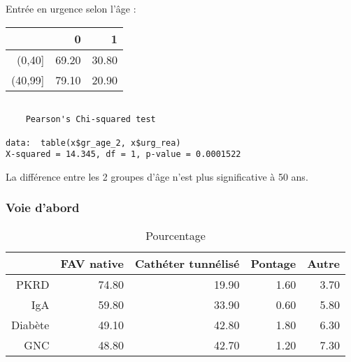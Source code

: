 \documentclass[11pt,a4paper]{article}\usepackage[]{graphicx}\usepackage[]{color}
\makeatletter
\newenvironment{kframe}{%
 \def\at@end@of@kframe{}%
 \ifinner\ifhmode%
  \def\at@end@of@kframe{\end{minipage}}%
  \begin{minipage}{\columnwidth}%
 \fi\fi%
 \def\FrameCommand##1{\hskip\@totalleftmargin \hskip-\fboxsep
 \colorbox{shadecolor}{##1}\hskip-\fboxsep
     \hskip-\linewidth \hskip-\@totalleftmargin \hskip\columnwidth}%
 \MakeFramed {\advance\hsize-\width
   \@totalleftmargin\z@ \linewidth\hsize
   \@setminipage}}%
 {\par\unskip\endMakeFramed%
 \at@end@of@kframe}
\newenvironment{knitrout}{}{} %
\makeatother
\begin{document}
Entrée en urgence selon l'âge :

\begin{table}[H]
\centering
\begin{tabular}{rrr}
  \hline
 & 0 & 1 \\ 
  \hline
(0,40] & 69.20 & 30.80 \\ 
  (40,99] & 79.10 & 20.90 \\ 
   \hline
\end{tabular}
\end{table}


\begin{knitrout}
\color{fgcolor}\begin{kframe}
\begin{verbatim}

	Pearson's Chi-squared test

data:  table(x$gr_age_2, x$urg_rea)
X-squared = 14.345, df = 1, p-value = 0.0001522
\end{verbatim}
\end{kframe}
\end{knitrout}

La différence entre les 2 groupes d'âge n'est plus significative à 50 ans.

  \subsubsection*{Voie d’abord}

\begin{table}[H]
\centering
\begin{tabular}{rrrrr}
  \hline
 & FAV native & Cathéter tunnélisé & Pontage & Autre \\ 
  \hline
PKRD & 74.80 & 19.90 & 1.60 & 3.70 \\ 
  IgA & 59.80 & 33.90 & 0.60 & 5.80 \\ 
  Diabète & 49.10 & 42.80 & 1.80 & 6.30 \\ 
  GNC & 48.80 & 42.70 & 1.20 & 7.30 \\ 
   \hline
\end{tabular}
\caption{Pourcentage} 
\end{table}
\end{document}
